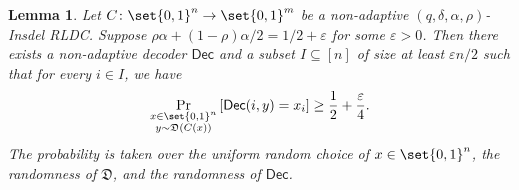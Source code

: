 \documentclass[10pt,a4paper]{article}
\newtheorem{lemma}{Lemma}
\theoremstyle{remark}
\newcommand{\eps}{\ensuremath{\varepsilon}}
\newcommand{\Dec}{\ensuremath{\mathsf{Dec}}\xspace}
\begin{document}
\begin{lemma} \label{lem:reduce-to-ILDC}
Let $C \colon \set{0,1}^n \rightarrow \set{0,1}^m$ be a non-adaptive $(q,\delta,\alpha,\rho)$-Insdel RLDC. Suppose $\rho\alpha + (1-\rho)\alpha/2 = 1/2+\eps$ for some $\eps > 0$. Then there exists a non-adaptive decoder $\Dec$ and a subset $I \subseteq [n]$ of size at least $\eps n/2$ such that for every $i \in I$, we have 
\begin{align*}
	\Pr_{\substack{x \in \set{0,1}^n \\ y \sim \mathfrak{D}(C(x))}}\left[ \Dec(i, y) = x_i \right] \ge \frac{1}{2} + \frac{\eps}{4}.
\end{align*}
The probability is taken over the uniform random choice of $x \in \set{0,1}^n$, the randomness of $\mathfrak{D}$, and the randomness of $\Dec$.
\end{lemma}
\end{document}
